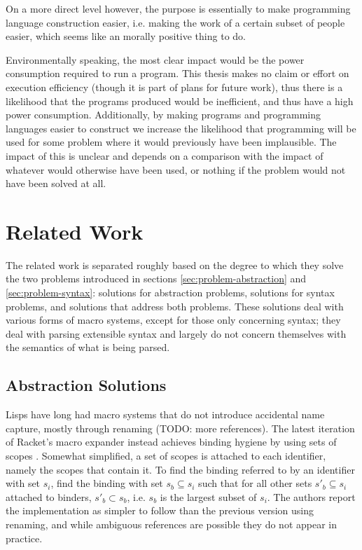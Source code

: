 \documentclass{kththesis}
\begin{document}
On a more direct level however, the purpose is essentially to make programming language construction easier, i.e. making the work of a certain subset of people easier, which seems like an morally positive thing to do.

Environmentally speaking, the most clear impact would be the power consumption required to run a program. This thesis makes no claim or effort on execution efficiency (though it is part of plans for future work), thus there is a likelihood that the programs produced would be inefficient, and thus have a high power consumption. Additionally, by making programs and programming languages easier to construct we increase the likelihood that programming will be used for some problem where it would previously have been implausible. The impact of this is unclear and depends on a comparison with the impact of whatever would otherwise have been used, or nothing if the problem would not have been solved at all.

\chapter{Related Work}

The related work is separated roughly based on the degree to which they solve the two problems introduced in sections \ref{sec:problem-abstraction} and \ref{sec:problem-syntax}: solutions for abstraction problems, solutions for syntax problems, and solutions that address both problems. These solutions deal with various forms of macro systems, except for those only concerning syntax; they deal with parsing extensible syntax and largely do not concern themselves with the semantics of what is being parsed.

\section{Abstraction Solutions} \label{sec:abstraction-solutions}

Lisps have long had macro systems that do not introduce accidental name capture, mostly through renaming \cite{FLATT2012Macros-that-Wor}(TODO: more references). The latest iteration of Racket's \cite{Flatt2010Reference:-Rack} macro expander instead achieves binding hygiene by using sets of scopes \cite{Flatt2016Binding-As-Sets}. Somewhat simplified, a set of scopes is attached to each identifier, namely the scopes that contain it. To find the binding referred to by an identifier with set $s_i$, find the binding with set $s_b \subseteq s_i$ such that for all other sets $s'_b \subseteq s_i$ attached to binders, $s'_b \subset s_b$, i.e. $s_b$ is the largest subset of $s_i$. The authors report the implementation as simpler to follow than the previous version using renaming, and while ambiguous references are possible they do not appear in practice.
\end{document}
